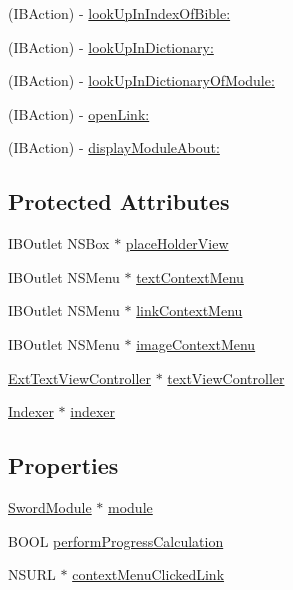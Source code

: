 \begin{DoxyCompactItemize}
\item 
(I\-B\-Action) -\/ \hyperlink{interface_module_view_controller_ac6d3095552bad1b1ff74a3291928fe68}{look\-Up\-In\-Index\-Of\-Bible\-:}
\item 
(I\-B\-Action) -\/ \hyperlink{interface_module_view_controller_aa5063fbebfe24aff0910ced51558ce4f}{look\-Up\-In\-Dictionary\-:}
\item 
(I\-B\-Action) -\/ \hyperlink{interface_module_view_controller_a27f9fde6424976e1fc929a88a68cff8c}{look\-Up\-In\-Dictionary\-Of\-Module\-:}
\item 
(I\-B\-Action) -\/ \hyperlink{interface_module_view_controller_aaa256786cbc78bf2414a38d012961d22}{open\-Link\-:}
\item 
(I\-B\-Action) -\/ \hyperlink{interface_module_view_controller_ae33ea5821124cb7c5505e60a9679d7b9}{display\-Module\-About\-:}
\end{DoxyCompactItemize}
\subsection*{Protected Attributes}
\begin{DoxyCompactItemize}
\item 
I\-B\-Outlet N\-S\-Box $\ast$ \hyperlink{interface_module_view_controller_a9a9977454586999c31286b17841fe58b}{place\-Holder\-View}
\item 
I\-B\-Outlet N\-S\-Menu $\ast$ \hyperlink{interface_module_view_controller_a02b2bd514de65dc47edc557e3f39e71e}{text\-Context\-Menu}
\item 
I\-B\-Outlet N\-S\-Menu $\ast$ \hyperlink{interface_module_view_controller_a5aa9c58bd26a160fadd38c0f6dff339d}{link\-Context\-Menu}
\item 
I\-B\-Outlet N\-S\-Menu $\ast$ \hyperlink{interface_module_view_controller_a5725748af4a2a253c46f52f9984cdfed}{image\-Context\-Menu}
\item 
\hyperlink{interface_ext_text_view_controller}{Ext\-Text\-View\-Controller} $\ast$ \hyperlink{interface_module_view_controller_a0452961582a310ae1acbe0d48f8ccaa6}{text\-View\-Controller}
\item 
\hyperlink{interface_indexer}{Indexer} $\ast$ \hyperlink{interface_module_view_controller_ac105518e4ab52f055cfb642583921fbf}{indexer}
\end{DoxyCompactItemize}
\subsection*{Properties}
\begin{DoxyCompactItemize}
\item 
\hyperlink{interface_sword_module}{Sword\-Module} $\ast$ \hyperlink{interface_module_view_controller_a4d9ff35b74c4bbf911e200fd553a7090}{module}
\item 
B\-O\-O\-L \hyperlink{interface_module_view_controller_af810dd4770996b23d6ba667b91fc33f1}{perform\-Progress\-Calculation}
\item 
N\-S\-U\-R\-L $\ast$ \hyperlink{interface_module_view_controller_a79873fe7e12ce6ca97409a0e056bf2de}{context\-Menu\-Clicked\-Link}
\end{DoxyCompactItemize}


